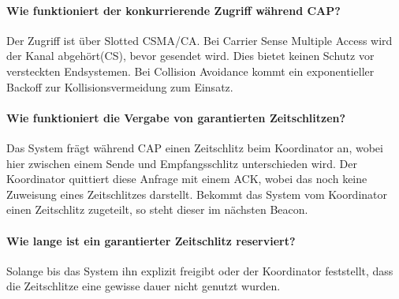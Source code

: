 	\begin{figure}[H]
		\centering
\end{figure}			

	\paragraph{Wie funktioniert der konkurrierende Zugriff während CAP?}
	Der Zugriff ist über Slotted CSMA/CA.
	Bei Carrier Sense Multiple Access wird der Kanal abgehört(CS), bevor gesendet wird. Dies bietet keinen Schutz vor versteckten Endsystemen. Bei Collision Avoidance kommt ein exponentieller Backoff zur Kollisionsvermeidung zum Einsatz.  
	
	\paragraph{Wie funktioniert die Vergabe von garantierten Zeitschlitzen?}
	Das System frägt während CAP einen Zeitschlitz beim Koordinator an, wobei hier zwischen einem Sende und Empfangsschlitz unterschieden wird. Der Koordinator quittiert diese Anfrage mit einem ACK, wobei das noch keine Zuweisung eines Zeitschlitzes darstellt. Bekommt das System vom Koordinator einen Zeitschlitz zugeteilt, so steht dieser im nächsten Beacon.
	
	\paragraph{Wie lange ist ein garantierter Zeitschlitz reserviert?}
	Solange bis das System ihn explizit freigibt oder der Koordinator feststellt, dass die Zeitschlitze eine gewisse dauer nicht genutzt wurden.
	
